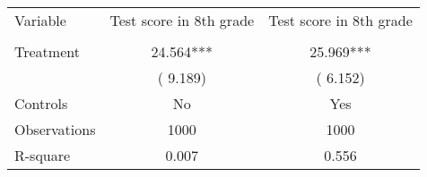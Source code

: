 \begin{tabular}{lcc} \toprule \toprule
Variable                    &       Test score in 8th grade        & Test score in 8th grade \\
\addlinespace \hline \\
Treatment & 24.564*** & 25.969***\\
& ( 9.189) & ( 6.152)\\ \addlinespace
Controls & No & Yes \\
Observations & 1000 & 1000 \\
R-square &  0.007 &  0.556 \\
\hline \hline
\end{tabular}
